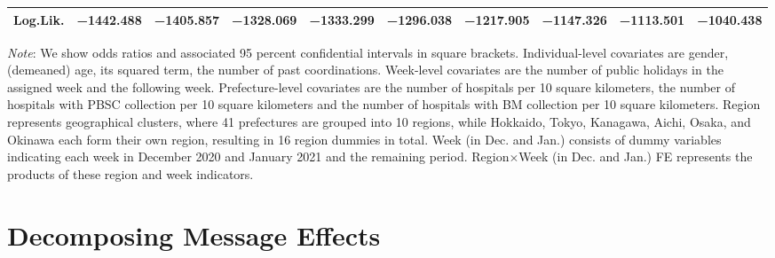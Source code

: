 \documentclass[12pt, a4paper]{article}
\begin{document}
\begin{landscape}
\begin{table}[H]
\begin{threeparttable}
\begin{tabular}[t]{lccccccccc}
Log.Lik. & \num{-1442.488} & \num{-1405.857} & \num{-1328.069} & \num{-1333.299} & \num{-1296.038} & \num{-1217.905} & \num{-1147.326} & \num{-1113.501} & \num{-1040.438}\\
\bottomrule
\end{tabular}
\begin{tablenotes}
\item \emph{Note}: We show odds ratios and associated 95 percent confidential intervals in square brackets. Individual-level covariates are gender, (demeaned) age, its squared term, the number of past coordinations. Week-level covariates are the number of public holidays in the assigned week and the following week. Prefecture-level covariates are the number of hospitals per 10 square kilometers, the number of hospitals with PBSC collection per 10 square kilometers and the number of hospitals with BM collection per 10 square kilometers. Region represents geographical clusters, where 41 prefectures are grouped into 10 regions, while Hokkaido, Tokyo, Kanagawa, Aichi, Osaka, and Okinawa each form their own region, resulting in 16 region dummies in total. Week (in Dec. and Jan.) consists of dummy variables indicating each week in December 2020 and January 2021 and the remaining period. Region$\times$Week (in Dec. and Jan.) FE represents the products of these region and week indicators.
\end{tablenotes}
\end{threeparttable}
\end{table}
\end{landscape}

\clearpage

\hypertarget{decomposing-message-effects}{%
\section{Decomposing Message Effects}\label{decomposing-message-effects}}
\end{document}

